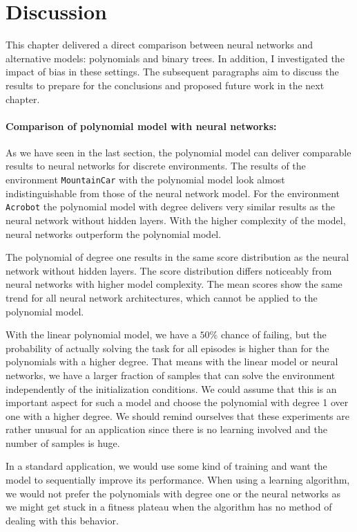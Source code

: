 \clearpage
\section{Discussion}
This chapter delivered a direct comparison between neural networks and alternative models: polynomials and binary trees. In addition, I investigated the impact of bias in these settings. The subsequent paragraphs aim to discuss the results to prepare for the conclusions and proposed future work in the next chapter.

\paragraph*{Comparison of polynomial model with neural networks:} As we have seen in the last section, the polynomial model can deliver comparable results to neural networks for discrete environments. The results of the environment \texttt{MountainCar} with the polynomial model look almost indistinguishable from those of the neural network model. For the environment \texttt{Acrobot} the polynomial model with degree delivers very similar results as the neural network without hidden layers. With the higher complexity of the model, neural networks outperform the polynomial model.

The polynomial of degree one results in the same score distribution as the neural network without hidden layers. The score distribution differs noticeably from neural networks with higher model complexity. The mean scores show the same trend for all neural network architectures, which cannot be applied to the polynomial model.

With the linear polynomial model, we have a $50 \%$ chance of failing, but the probability of actually solving the task for all episodes is higher than for the polynomials with a higher degree. That means with the linear model or neural networks, we have a larger fraction of samples that can solve the environment independently of the initialization conditions. We could assume that this is an important aspect for such a model and choose the polynomial with degree 1 over one with a higher degree. We should remind ourselves that these experiments are rather unusual for an application since there is no learning involved and the number of samples is huge.

In a standard application, we would use some kind of training and want the model to sequentially improve its performance. When using a learning algorithm, we would not prefer the polynomials with degree one or the neural networks as we might get stuck in a fitness plateau when the algorithm has no method of dealing with this behavior.

